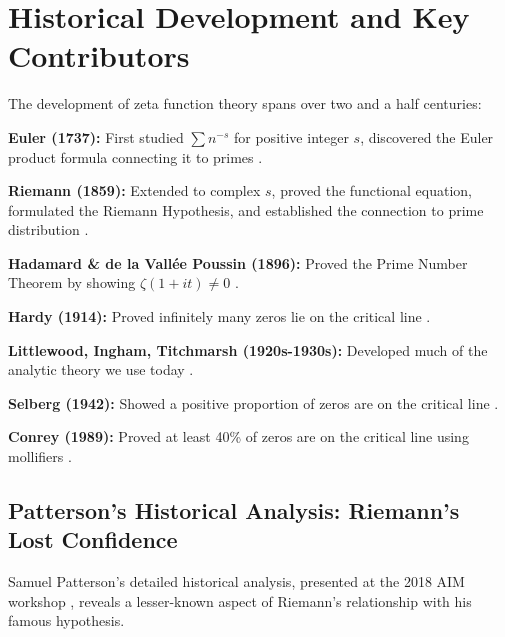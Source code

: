 \section{Historical Development and Key Contributors}
\label{sec:historical_development}

\begin{historicalnote}
The development of zeta function theory spans over two and a half centuries:

\textbf{Euler (1737):} First studied $\sum n^{-s}$ for positive integer $s$, discovered the Euler product formula connecting it to primes \cite{edwards1974}.

\textbf{Riemann (1859):} Extended to complex $s$, proved the functional equation, formulated the Riemann Hypothesis, and established the connection to prime distribution \cite{riemann1859}.

\textbf{Hadamard \& de la Vallée Poussin (1896):} Proved the Prime Number Theorem by showing $\zeta(1+it) \neq 0$ \cite{davenport2000}.

\textbf{Hardy (1914):} Proved infinitely many zeros lie on the critical line \cite{hardy1914}.

\textbf{Littlewood, Ingham, Titchmarsh (1920s-1930s):} Developed much of the analytic theory we use today \cite{titchmarsh1986}.

\textbf{Selberg (1942):} Showed a positive proportion of zeros are on the critical line \cite{selberg1942}.

\textbf{Conrey (1989):} Proved at least 40\% of zeros are on the critical line using mollifiers \cite{conrey1989}.
\end{historicalnote}

\subsection{Patterson's Historical Analysis: Riemann's Lost Confidence}
\label{subsec:patterson_analysis}

Samuel Patterson's detailed historical analysis, presented at the 2018 AIM workshop \cite{patterson2018}, reveals a lesser-known aspect of Riemann's relationship with his famous hypothesis.

